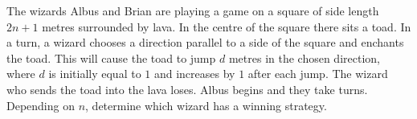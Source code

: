 The wizards Albus and Brian are playing a game on a square of side length $2n+1$ metres surrounded by lava.
In the centre of the square there sits a toad.
In a turn, a wizard chooses a direction parallel to a side of the square and enchants the toad.
This will cause the toad to jump $d$ metres in the chosen direction,
where $d$ is initially equal to $1$ and increases by $1$ after each jump.
The wizard who sends the toad into the lava loses.
Albus begins and they take turns.
Depending on $n$, determine which wizard has a winning strategy.
